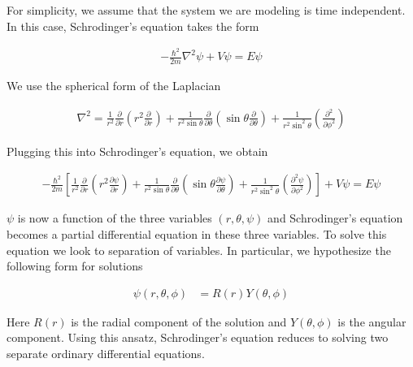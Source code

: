 \documentclass[book.tex]{subfiles}
\begin{document}
For simplicity, we assume that the system we are modeling is time independent. In this case, Schrodinger's equation takes the form 

\begin{align}
-\frac{\hbar^2}{2m} \nabla^2 \psi + V \psi = E \psi
\end{align}

We use the spherical form of the Laplacian %

\begin{align}
    \nabla^2 = \frac{1}{r^2} \frac{\partial}{\partial r} \left ( r^2 \frac{\partial}{\partial r} \right) + \frac{1}{r^2 \sin \theta} \frac{\partial}{\partial \theta} \left ( \sin \theta \frac{\partial}{\partial \theta} \right ) + \frac{1}{r^2 \sin^2 \theta} \left ( \frac{\partial^2}{\partial \phi^2}\right )
\end{align}

Plugging this into Schrodinger's equation, we obtain

\begin{align}
    -\frac{\hbar^2}{2m} \left [ \frac{1}{r^2} \frac{\partial}{\partial r} \left ( r^2 \frac{\partial \psi}{\partial r} \right) + \frac{1}{r^2 \sin \theta} \frac{\partial }{\partial \theta} \left ( \sin \theta \frac{\partial \psi}{\partial \theta} \right ) + \frac{1}{r^2 \sin^2 \theta} \left ( \frac{\partial^2 \psi}{\partial \phi^2}\right ) \right ] + V \psi = E\psi
\end{align}

$\psi$ is now a function of the three variables $(r, \theta, \psi)$ and Schrodinger's equation becomes a partial differential equation in these three variables. To solve this equation we look to separation of variables. In particular, we hypothesize the following form for solutions

\begin{align}
    \psi(r, \theta, \phi) &= R(r)Y(\theta, \phi)
\end{align}

Here $R(r)$ is the radial component of the solution and $Y(\theta,\phi)$ is the angular component. Using this ansatz, Schrodinger's equation reduces to solving two separate ordinary differential equations.

\end{document}

